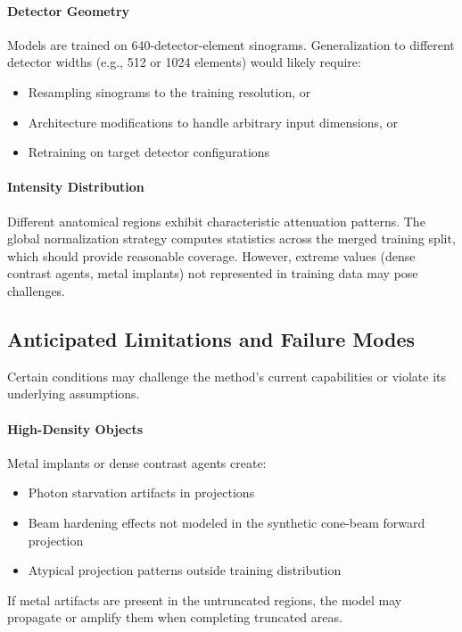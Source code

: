 \paragraph{Detector Geometry}
Models are trained on 640-detector-element sinograms. Generalization to different detector widths (e.g., 512 or 1024 elements) would likely require:
\begin{itemize}
    \item Resampling sinograms to the training resolution, or
    \item Architecture modifications to handle arbitrary input dimensions, or
    \item Retraining on target detector configurations
\end{itemize}

\paragraph{Intensity Distribution}
Different anatomical regions exhibit characteristic attenuation patterns. The global normalization strategy computes statistics across the merged training split, which should provide reasonable coverage. However, extreme values (dense contrast agents, metal implants) not represented in training data may pose challenges.

\subsection{Anticipated Limitations and Failure Modes}

Certain conditions may challenge the method's current capabilities or violate its underlying assumptions.

\paragraph{High-Density Objects}
Metal implants or dense contrast agents create:
\begin{itemize}
    \item Photon starvation artifacts in projections
    \item Beam hardening effects not modeled in the synthetic cone-beam forward projection
    \item Atypical projection patterns outside training distribution
\end{itemize}

If metal artifacts are present in the untruncated regions, the model may propagate or amplify them when completing truncated areas.

